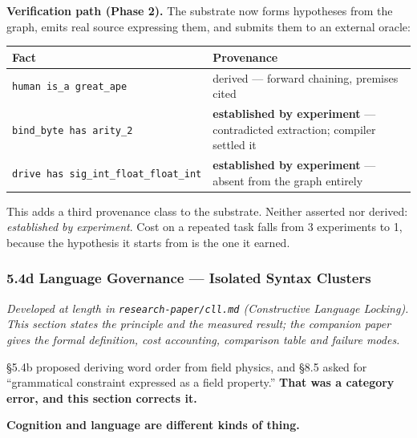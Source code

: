 \documentclass[
  11pt,
  a4paper,
]{article}
\begin{document}
\textbf{Verification path (Phase 2).} The substrate now forms hypotheses
from the graph, emits real source expressing them, and submits them to
an external oracle:

\begin{longtable}[]{@{}
  >{\raggedright\arraybackslash}p{}
  >{\raggedright\arraybackslash}p{}@{}}
\toprule\noalign{}
\begin{minipage}[b]{\linewidth}\raggedright
Fact
\end{minipage} & \begin{minipage}[b]{\linewidth}\raggedright
Provenance
\end{minipage} \\
\midrule\noalign{}
\endhead
\bottomrule\noalign{}
\endlastfoot
\texttt{human\ is\_a\ great\_ape} & derived --- forward chaining,
premises cited \\
\texttt{bind\_byte\ has\ arity\_2} & \textbf{established by experiment}
--- contradicted extraction; compiler settled it \\
\texttt{drive\ has\ sig\_int\_float\_float\_int} & \textbf{established
by experiment} --- absent from the graph entirely \\
\end{longtable}

This adds a third provenance class to the substrate. Neither asserted
nor derived: \emph{established by experiment}. Cost on a repeated task
falls from 3 experiments to 1, because the hypothesis it starts from is
the one it earned.

\subsubsection{5.4d Language Governance --- Isolated Syntax
Clusters}\label{d-language-governance-isolated-syntax-clusters}

\emph{Developed at length in \texttt{research-paper/cll.md}
(Constructive Language Locking). This section states the principle and
the measured result; the companion paper gives the formal definition,
cost accounting, comparison table and failure modes.}

§5.4b proposed deriving word order from field physics, and §8.5 asked
for ``grammatical constraint expressed as a field property.''
\textbf{That was a category error, and this section corrects it.}

\textbf{Cognition and language are different kinds of thing.}
\end{document}
